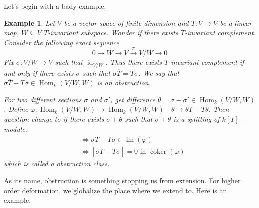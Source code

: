 \documentclass{ctexart}
\newtheorem{example}{Example}[section]
\renewcommand{\hom}{\operatorname{Hom}}
\newcommand{\im}{\operatorname{im}}
\newcommand{\identity}{\operatorname{id}}
\newcommand{\coker}{\operatorname{coker}}
\begin{document}
Let's begin with a bady example.
\begin{example}
    Let $V$ be a vector space of finite dimension and $T: V \rightarrow V$ be a linear map, 
    $W \subseteq V$ $T$-invariant subspace.
    Wonder if there exists $T$-invariant complement.
    Consider the following exact sequence
    \begin{equation}
        0 \longrightarrow W \longrightarrow V \overset{\pi}{\longrightarrow} V/W \longrightarrow 0
    \end{equation}
    Fix $\sigma: V/W \rightarrow V$ such that $\identity_{V/W}$.
    Thus there exists $T$-invariant complement if and only if there exists $\sigma$ such that $\sigma\overline{T} = T\sigma$.
    We say that $\sigma\overline{T} - T\sigma\in \hom_{k}(V/W, W)$ is an obstruction.
    \par
    For two different sections $\sigma$ and $\sigma'$, get difference $\theta = \sigma - \sigma'\in \hom_{k}(V/W, W)$.
    Define $\varphi: \hom_{k}(V/W, W) \rightarrow \hom_{k}(V/W, W)\quad \theta \mapsto \theta\overline{T} - T\theta$.
    Then question change to if there exists $\sigma + \theta$ such that $\sigma + \theta$ is a splitting of $k[T]$-module.
    \begin{equation}
        \begin{split}
            & \iff \sigma\overline{T} - T\sigma\in \im(\varphi) \\
            & \iff [\sigma\overline{T} - T\sigma] = 0 \text{ in } \coker(\varphi)
        \end{split}
    \end{equation}
    which is called a obstruction class.
\end{example}
As its name, obstruction is something stopping us from extension.
For higher order deformation, we globalize the place where we extend to.
Here is an example.
\end{document}
